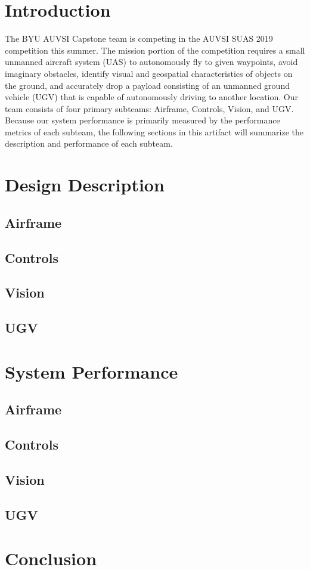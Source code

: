 \documentclass[]{auvsi_doc}
\begin{document}
\begin{AUVSITitlePage}
\begin{artifacttable}
\end{artifacttable}
\end{AUVSITitlePage}

\section{Introduction}
The BYU AUVSI Capstone team is competing in the AUVSI SUAS 2019 competition this summer. The mission portion of the competition requires a small unmanned aircraft system (UAS) to autonomously fly to given waypoints, avoid imaginary obstacles, identify visual and geospatial characteristics of objects on the ground, and accurately drop a payload consisting of an unmanned ground vehicle (UGV) that is capable of autonomously driving to another location. Our team consists of four primary subteams: Airframe, Controls, Vision, and UGV. Because our system performance is primarily measured by the performance metrics of each subteam, the following sections in this artifact will summarize the description and performance of each subteam.

\section{Design Description}
\subsection{Airframe}
\subsection{Controls}
\subsection{Vision}
\subsection{UGV}


\section{System Performance}
\subsection{Airframe}
\subsection{Controls}
\subsection{Vision}
\subsection{UGV}


\section{Conclusion}
\end{document}
